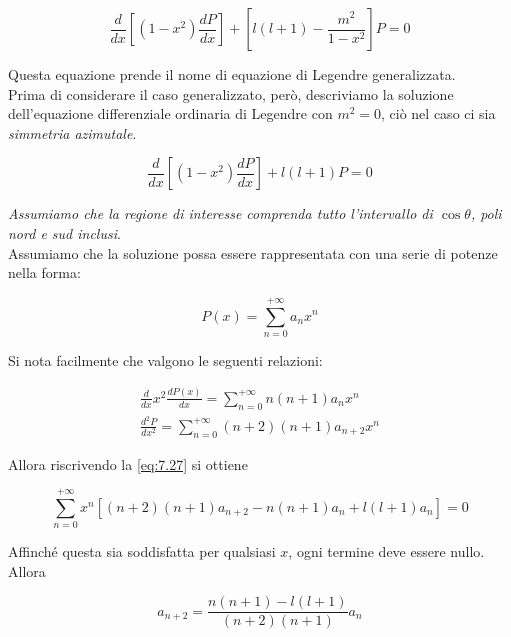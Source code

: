 \begin{equation}
    \frac{d}{dx} \left [ (1 - x^2) \frac{dP}{dx} \right] + \left[ l (l+1) - \frac{m^2}{1-x^2} \right] P = 0
    \label{eq:Legrendre_gen}
\end{equation}

Questa equazione  prende il nome di equazione di Legendre generalizzata. \\

Prima  di considerare il caso generalizzato, però, descriviamo la soluzione dell'equazione differenziale ordinaria di Legendre con $m^2 = 0$, ciò nel caso ci sia \emph{simmetria azimutale}.

\begin{equation}
    \frac{d}{dx} \left [ (1 - x^2) \frac{dP}{dx} \right] +  l (l+1) P = 0
    \label{eq:7.27}
\end{equation}

\emph{Assumiamo che la regione di interesse comprenda tutto l'intervallo di $\cos \theta$, poli nord e sud inclusi}. \\

Assumiamo che la soluzione possa essere rappresentata con una serie di potenze nella forma:

\begin{equation}
    P(x) = \sum_{n= 0}^ {+ \infty} a_n x^n
\end{equation}


Si nota facilmente che valgono le seguenti relazioni:

\begin{align}
    \frac{d}{dx} x^2 \frac{dP(x)}{dx} = \sum_{n = 0} ^ {+ \infty} n (n + 1) a_n x^n \\
    \frac{d^2 P}{dx^2} = \sum_{n = 0}^{+ \infty} (n +2) (n+1) a_{n + 2}x^n
\end{align} 

Allora riscrivendo la \ref{eq:7.27} si ottiene

\begin{equation*}
    \sum_{n = 0} ^ {+ \infty} x^n [ (n+2)(n+1) a_{n+2} - n (n+1)a_n + l(l+1) a_n ] = 0
\end{equation*}

Affinché questa sia soddisfatta per qualsiasi $x$, ogni termine deve essere nullo. Allora 

\begin{equation}
    a_{n+2} = \frac{n(n+1) - l(l+1)}{(n+2)(n+1)} a_n
\end{equation}

